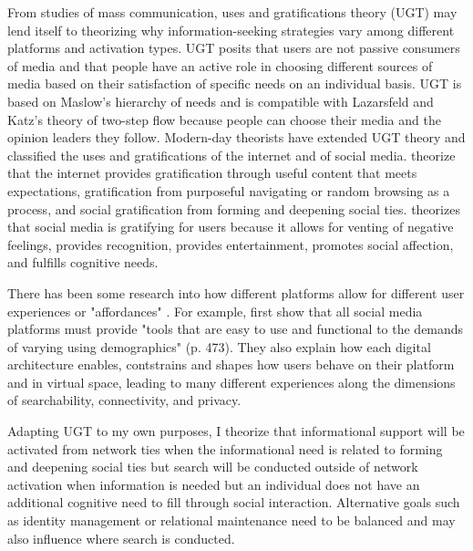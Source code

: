 From studies of mass communication, uses and gratifications theory (UGT)
\citep{blumlerUsesMassCommunications1974, tanMassCommunicationTheories1985} may
lend itself to theorizing why information-seeking strategies vary among different
platforms and activation types. UGT posits that users are not passive
consumers of media and that people have an active role in choosing different
sources of media based on their satisfaction of specific needs on an individual
basis. UGT is based on Maslow's \citeyearpar{maslowTheoryHumanMotivation1943}
hierarchy of needs and is compatible with Lazarsfeld and Katz's theory of
two-step flow because people can choose their media and the opinion leaders they
follow. Modern-day theorists have extended UGT theory and classified the uses
and gratifications of the internet and of social media.
\citet{staffordDeterminingUsesGratifications2004} theorize that the internet
provides gratification through useful content that meets expectations,
gratification from purposeful navigating or random browsing as a process, and
social gratification from forming and deepening social ties.
\citet{leungGenerationalDifferencesContent2013} theorizes that social media is
gratifying for users because it allows for venting of negative feelings,
provides recognition, provides entertainment, promotes social affection, and
fulfills cognitive needs. 

There has been some research into how different platforms allow for different user 
experiences or "affordances" \citep{boyd2010social}. For example, \citet{bossetta18} first show
that all social media platforms must provide "tools that are easy to use and 
functional to the demands of varying using demographics" (p. 473). They also
explain how each digital architecture enables, contstrains and shapes how users
behave on their platform and in virtual space, leading to many different experiences 
along the dimensions of searchability, connectivity, and privacy. 

Adapting UGT to my own purposes, I theorize that
informational support will be activated from network ties when the informational
need is related to forming and deepening social ties
\citep{baumeister,grieve2013face} but search will be conducted outside of network
activation when information is needed but an individual does not have an additional cognitive
need to fill through social interaction. Alternative goals such as identity
management or relational maintenance
\citep{brashersInformationSeekingAvoiding2002} need to be balanced and may also
influence where search is conducted.

